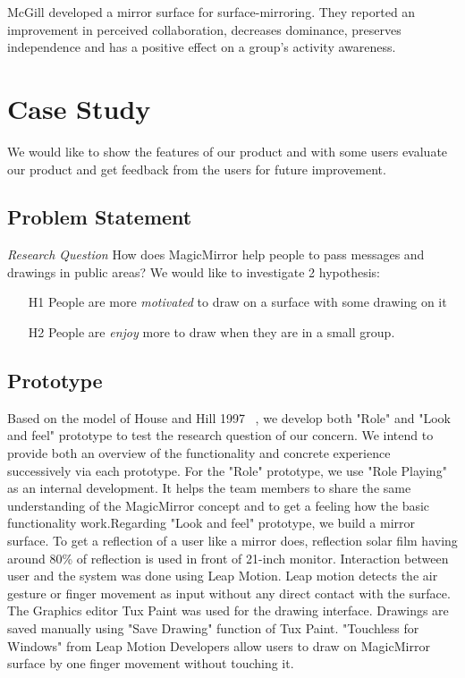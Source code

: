 \documentclass{sigchi-ext}
\begin{document}
McGill \cite{mcgillMirrorMirrorWall2014} developed a mirror surface for surface-mirroring. They reported an improvement in perceived collaboration, decreases dominance, preserves independence and has a positive effect on a group's activity awareness.

\section{Case Study}
We would like to show the features of our product and with some users evaluate our product and get feedback from the users for future improvement.
\subsection{Problem Statement}
\textit{Research Question} How does MagicMirror help people to pass messages and drawings in public areas?
We would like to investigate 2 hypothesis:
\begin{itemize}
	\item[H1] People are more \textit{motivated} to draw on a surface with some drawing on it
	\item[H2] People are \textit{enjoy} more to draw when they are in a small group.
\end{itemize}

\subsection{Prototype}
Based on the model of House and Hill 1997 ~\cite{houdeChapter16What1997}, we develop both "Role" and "Look and feel" prototype to test the research question of our concern. We intend to provide both an overview of the functionality and concrete experience successively via each prototype. For the "Role" prototype, we use "Role Playing" as an internal development. It helps the team members to share the same understanding of the MagicMirror concept and to get a feeling how the basic functionality work.Regarding "Look and feel" prototype, we build a mirror surface. To get a reflection of a user like a mirror does, reflection solar film having around 80\% of reflection is used in front of 21-inch monitor. Interaction between user and the system was done using Leap Motion. Leap motion detects the air gesture or finger movement as input without any direct contact with the surface. The Graphics editor Tux Paint was used for the drawing interface. Drawings are saved manually using "Save Drawing" function of Tux Paint. "Touchless for Windows" from Leap Motion Developers allow users to draw on MagicMirror surface by one finger movement without touching it.
\end{document}
